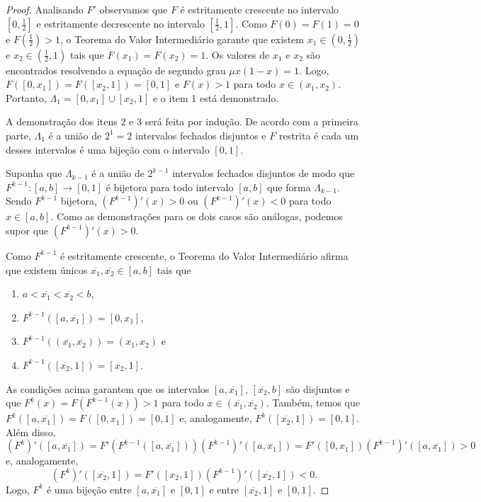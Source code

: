 \documentclass[a4paper, 12pt]{article}
\theoremstyle{definition}
\theoremstyle{plain}
\theoremstyle{plain}
\theoremstyle{plain}
\theoremstyle{definition}
\theoremstyle{remark}
\begin{document}
\begin{proof}
Analisando $F'$ observamos que $F$ é estritamente crescente no intervalo $\left[0, \frac{1}{2}\right]$ e estritamente decrescente no intervalo $\left[\frac{1}{2}, 1\right]$. Como $F(0) = F(1) = 0$ e $F\left(\frac{1}{2}\right) > 1$, o Teorema do Valor Intermediário garante que existem $x_1 \in \left(0, \frac{1}{2}\right)$ e $x_2 \in \left(\frac{1}{2}, 1\right)$ tais que $F(x_1) = F(x_2) = 1$. Os valores de $x_1$ e $x_2$ são encontrados resolvendo a equação de segundo grau $\mu x(1-x) = 1$. Logo, $F([0, x_1]) = F([x_2, 1]) = [0, 1]$ e $F(x) > 1$ para todo $x \in (x_1, x_2)$. Portanto, $\Lambda_1 = [0, x_1] \cup [x_2, 1]$ e o item 1 está demonstrado.

A demonstração dos itens $2$ e $3$ será feita por indução. De acordo com a primeira parte, $\Lambda_1$ é a união de $2^1 = 2$ intervalos fechados disjuntos e $F$ restrita é cada um desses intervalos é uma bijeção com o intervalo $[0,1]$.

Suponha que $\Lambda_{k-1}$ é a união de $2^{k-1}$ intervalos fechados disjuntos de modo que $F^{k-1}: [a, b] \to [0, 1]$ é bijetora para todo intervalo $[a, b]$ que forma $\Lambda_{k-1}$. Sendo $F^{k-1}$ bijetora, $(F^{k-1})'(x) > 0$ ou $(F^{k-1})'(x) < 0$ para todo $x \in [a, b]$. Como as demonstrações para os dois casos são análogas, podemos supor que $(F^{k-1})'(x) > 0$.

Como $F^{k-1}$ é estritamente crescente, o Teorema do Valor Intermediário afirma que existem únicos $\overline{x_1}, \overline{x_2} \in [a, b]$ tais que
\begin{enumerate}[label=(\alph*)]
\item$a < \overline{x_1} < \overline{x_2} < b$,
\item$F^{k-1}([a, \overline{x_1}]) = [0, x_1]$,
\item$F^{k-1}((\overline{x_1}, \overline{x_2})) = (x_1, x_2)$ e
\item$F^{k-1}([\overline{x_2}, 1]) = [x_2, 1]$.
\end{enumerate}

As condições acima garantem que os intervalos $[a, \overline{x_1}]$, $[\overline{x_2}, b]$ são disjuntos e que $F^k(x) = F(F^{k-1}(x)) > 1$ para todo $x \in (\overline{x_1}, \overline{x_2})$. Também, temos que $F^k([a, \overline{x_1}]) = F([0, x_1]) = [0, 1]$ e, analogamente, $F^k([\overline{x_2}, 1]) = [0, 1]$. Além disso, $$(F^k)'([a, \overline{x_1}]) = F'(F^{k-1}([a, \overline{x_1}]))(F^{k-1})'([a, \overline{x_1}]) = F'([0, x_1])(F^{k-1})'([a, \overline{x_1}]) > 0$$ e, analogamente, $$(F^k)'([\overline{x_2}, 1]) = F'([x_2, 1])(F^{k-1})'([\overline{x_2}, 1]) < 0.$$ Logo, $F^k$ é uma bijeção entre $[a, \overline{x_1}]$ e $[0, 1]$ e entre $[\overline{x_2}, 1]$ e $[0, 1]$.


\end{proof}
\end{document}
